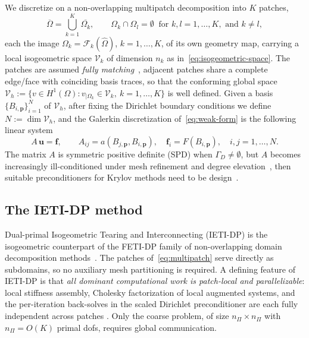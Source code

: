 \documentclass{article}
\newcommand{\vect}[1]{\boldsymbol{#1}}
\newcommand{\npatch}{K} %
\newcommand{\refdom}{\widehat{\Omega}}            %
\newcommand{\patchdom}[1]{\Omega_{#1}}            %
\newcommand{\Bphy}[2]{B_{#1,#2}}                  %
\newcommand{\Vglo}{\mathcal{V}_h}                  %
\newcommand{\Vloc}[1]{\mathcal{V}_{#1}}            %
\newcommand{\gmapk}[1]{\mathcal{F}_{#1}}         %
\newcommand{\Aglo}{A}                             %
\newcommand{\fglo}{\vect{f}}                      %
\newcommand{\uglo}{\vect{u}}                      %
\newcommand{\nprim}{n_\Pi}                        %
\theoremstyle{plain}
\numberwithin{equation}{section}
\begin{document}
We discretize on a non-overlapping multipatch decomposition into $\npatch$
patches,
\begin{equation}
    \overline{\Omega} = \bigcup_{k=1}^{\npatch} \overline{\patchdom{k}},
    \qquad \patchdom{k} \cap \patchdom{l} = \emptyset \ \text{ for } k,l = 1, \ldots, \npatch, \text{ and } k \neq l,
    \label{eq:multipatch}
\end{equation}
each the image $\patchdom{k} = \gmapk{k}(\refdom)$, $k = 1, \ldots, \npatch$, of its own geometry
map, carrying a local isogeometric space $\Vloc{k}$ of dimension $n_k$ as
in~\eqref{eq:isogeometric-space}. The patches are assumed \emph{fully
    matching}~\cite{kleiss2012ieti}, adjacent patches share a complete edge/face with
coinciding basis traces, so that the conforming global space $\Vglo :=
    \{ v \in H^1(\Omega) : v_{|\patchdom{k}} \in \Vloc{k}, \ k=1, \ldots, \npatch \}$ is well defined. Given a
basis $\{\Bphy{i}{\vect{p}}\}_{i=1}^{N}$ of $\Vglo$, after fixing the Dirichlet boundary conditions we define $N := \dim \Vglo$, and the
Galerkin discretization of~\eqref{eq:weak-form} is the following linear system
\begin{equation}
    \Aglo\, \uglo = \fglo, \qquad
    \Aglo_{ij} = a(\Bphy{j}{\vect{p}}, \Bphy{i}{\vect{p}}), \quad
    \fglo_i = F(\Bphy{i}{\vect{p}}), \quad i, j = 1, \dots, N.
    \label{eq:global-system}
\end{equation}
The matrix $\Aglo$ is symmetric positive definite (SPD) when $\Gamma_D \neq \emptyset$, but $\Aglo$ becomes
increasingly ill-conditioned under mesh refinement and
degree elevation~\cite{gahalaut2019condition, sangalli2016isogeometric},
then suitable preconditioners for Krylov
methods need to be design~\cite{van2003iterative}.

\subsection{The IETI-DP method} \label{subsec:ieti}

Dual-primal Isogeometric Tearing and Interconnecting (IETI-DP) is the
isogeometric counterpart of the FETI-DP family of non-overlapping domain
decomposition methods~\cite{farhat1991method, toselli2004domain}.
The patches of~\eqref{eq:multipatch} serve directly as subdomains, so no
auxiliary mesh partitioning is required.
A defining feature of IETI-DP is that \emph{all dominant computational
    work is patch-local and parallelizable}: local stiffness assembly,
Cholesky factorization of local augmented systems, and the per-iteration
back-solves in the scaled Dirichlet preconditioner are each fully independent
across patches \cite{kleiss2012ieti}. Only the coarse problem, of size $\nprim \times \nprim$ with $\nprim = O(K)$
primal dofs, requires global communication.
\end{document}
